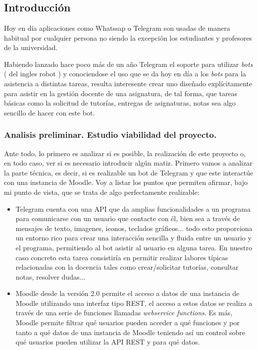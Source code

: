 \chapter{}



\section{Introducción}

Hoy en día aplicaciones como Whatssap o Telegram son usadas de manera habitual por cualquier persona no siendo la excepción los estudiantes y profesores de la universidad.

\par
Habiendo lanzado hace poco más de un año Telegram el soporte para utilizar \textit{bots} ( del ingles robot ) y conociendose el uso que se da hoy en día a los \textit{bots} para la asistencia a distintas tareas,  resulta interesente crear uno diseñado explícitamente para asistir en la gestión docente de una asignatura, de tal forma, que tareas básicas como la solicitud de tutorías, entregas de asignaturas, notas sea algo sencillo de hacer con este bot.

\subsection{Analisis preliminar. Estudio viabilidad del proyecto.}

Ante todo, lo primero es analizar si es posible, la realización de este proyecto o, en todo caso, ver si es necesario introducir algún matiz. Primero vamos a analizar la parte técnica, es decir, si es realizable un bot de Telegram y que este interactúe con una instancia de Moodle. Voy a listar los puntos que permiten afirmar, bajo mi punto de vista, que se trata de algo perfectamente realizable:

\begin{itemize}
\item Telegram cuenta con una API que da amplias funcionalidades a un programa para comunicarse con un usuario que contacte con él, bien sea a través de mensajes de texto, imagenes, iconos, teclados gráficos... todo esto proporciona un entorno rico para crear una interacción  sencilla y fluida entre un usuario y el programa, permitiendo al bot asistir al usuario en alguna tarea. En nuestro caso concreto esta tarea consistiría en permitir  realizar labores típicas relacionadas con la docencia tales como crear/solicitar tutorías, consultar notas, resolver dudas... 
\item Moodle desde la versión 2.0 permite el acceso a datos de una instancia de Moodle utilizando una interfaz tipo REST, el acceso a estos datos se realiza a través de una serie de funciones llamadas \textit{webservice functions}.  Es más, Moodle permite filtrar qué usuarios pueden acceder a qué funciones y por tanto a qué datos de una instancia de Moodle  teniendo así un control sobre qué usuarios pueden utilizar la API REST y para qué datos.
\end{itemize}

